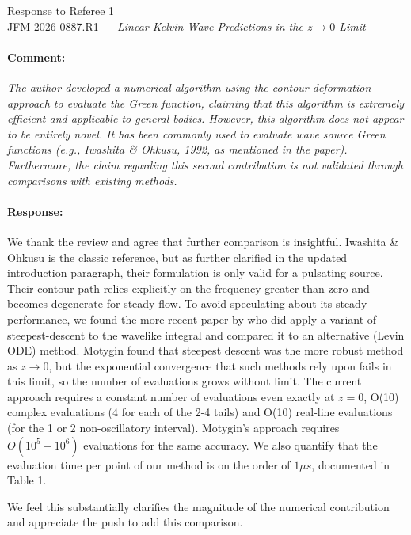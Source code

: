 \documentclass[11pt,a4paper]{article}
\begin{document}
\begin{center}
{\Large Response to Referee 1}\\[6pt]
{\large JFM-2026-0887.R1 ---
\textit{Linear Kelvin Wave Predictions in the $z\to 0$ Limit}}\\[6pt]
\end{center}

\bigskip

\paragraph{Comment:}
\textit{The author developed a numerical algorithm using the contour-deformation approach to evaluate the Green function, claiming that this algorithm is extremely efficient and applicable to general bodies. However, this algorithm does not appear to be entirely novel. It has been commonly used to evaluate wave source Green functions (e.g., Iwashita & Ohkusu, 1992, as mentioned in the paper). Furthermore, the claim regarding this second contribution is not validated through comparisons with existing methods.}

\paragraph{Response:}
We thank the review and agree that further comparison is insightful. Iwashita \& Ohkusu is the classic reference, but as further clarified in the updated introduction paragraph, their formulation is only valid for a pulsating source. Their contour path relies explicitly on the frequency greater than zero and becomes degenerate for steady flow. To avoid speculating about its steady performance, we found the more recent paper by \cite{motygin_numerical_2017} who did apply a variant of steepest-descent to the wavelike integral and compared it to an alternative (Levin ODE) method. Motygin found that steepest descent was the more robust method as $z\to 0$, but the exponential convergence that such methods rely upon fails in this limit, so the number of evaluations grows without limit. The current approach requires a constant number of evaluations even exactly at $z=0$, O(10) complex evaluations (4 for each of the 2-4 tails) and O(10) real-line evaluations (for the 1 or 2 non-oscillatory interval). Motygin's approach requires $O(10^5-10^6)$ evaluations for the same accuracy. We also quantify that the evaluation time per point of our method is on the order of $1\mu s$, documented in Table 1. 

We feel this substantially clarifies the magnitude of the numerical contribution and appreciate the push to add this comparison. 
\end{document}
